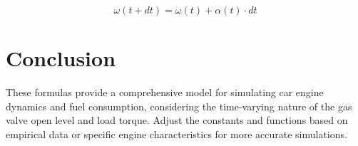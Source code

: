 \documentclass{article}
\begin{document}
\begin{equation}
\omega(t+dt) = \omega(t) + \alpha(t) \cdot dt
\end{equation}

\section{Conclusion}
These formulas provide a comprehensive model for simulating car engine dynamics and fuel consumption, considering the time-varying nature of the gas valve open level and load torque. Adjust the constants and functions based on empirical data or specific engine characteristics for more accurate simulations.
\end{document}
